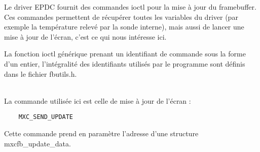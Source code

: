 Le driver EPDC fournit des commandes ioctl pour la mise à jour du framebuffer. Ces commandes permettent de récupérer toutes les variables du driver (par exemple la température relevé par la sonde interne), mais aussi de lancer une mise à jour de l'écran, c'est ce qui nous intéresse ici.

La fonction ioctl générique prenant un identifiant de commande sous la forme d'un entier, l'intégralité des identifiants utilisés par le programme sont définis dans le fichier fbutils.h. %

~\\
La commande utilisée ici est celle de mise à jour de l'écran : 
\begin{lstlisting}
	MXC_SEND_UPDATE
\end{lstlisting}
Cette commande prend en paramètre l'adresse d'une structure mxcfb_update_data.

